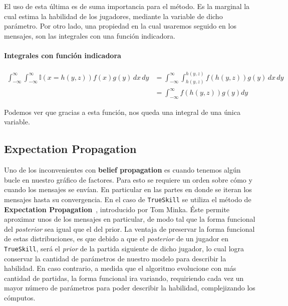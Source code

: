 \documentclass[11pt,twoside,spanish]{report} %
\begin{document}
El uso de esta \'ultima es de suma importancia para el m\'etodo.
Es la marginal la cual estima la habilidad de los jugadores, mediante la variable de dicho par\'ametro.
Por otro lado, una propiedad en la cual usaremos seguido en los mensajes, son las integrales con una funci\'on indicadora.

\paragraph{Integrales con funci\'on indicadora}
\begin{equation}\label{eq:integral_con_indicadora}
\begin{split}
\int_{-\infty}^{\infty}  \int_{-\infty}^{\infty}  \mathbb{I}(x=h(y,z)) f(x) g(y)\, dx\, dy &=  \int_{-\infty}^{\infty} \int_{h(y,z)}^{h(y,z)} f(h(y,z)) g(y)\, dx\, dy\\
& = \int_{-\infty}^{\infty} f(h(y,z)) g(y) dy
\end{split}
\end{equation}

Podemos ver que gracias a esta funci\'on, nos queda una integral de una \'unica variable.


\subsection{Expectation Propagation}
Uno de los inconvenientes con \textbf{belief propagation} es cuando tenemos alg\'un bucle en nuestro gr\'afico de factores.
Para esto se requiere un orden sobre c\'omo y cuando los mensajes se env\'ian.
En particular en las partes en donde se iteran los mensajes hasta su convergencia.
En el caso de \texttt{TrueSkill} se utiliza el m\'etodo de \textbf{Expectation Propagation}~\cite{herbrich2005}, introducido por Tom Minka.
\'Este permite aproximar unos de los mensajes en particular, de modo tal que  la forma funcional del \textit{posterior} sea igual que el del prior.
La ventaja de preservar la forma funcional de estas distribuciones, es que debido a que el \textit{posterior} de un jugador en \texttt{TrueSkill},  ser\'a el \textit{prior} de la partida siguiente de dicho jugador, lo cual logra conservar la cantidad de par\'ametros de nuestro modelo para describir la habilidad.
En caso contrario, a medida que el algoritmo evolucione con m\'as cantidad de partidas, la forma funcional ira variando, requiriendo cada vez un mayor n\'umero de par\'ametros para poder describir la habilidad, complejizando los c\'omputos.
\end{document}
